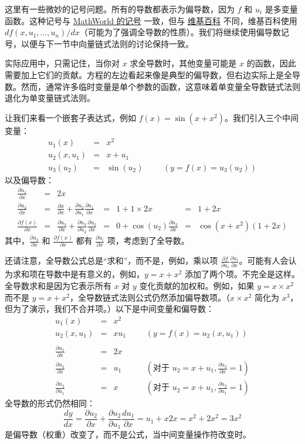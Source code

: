 \documentclass[11pt]{article}
\begin{document}
这里有一些微妙的记号问题。所有的导数都表示为偏导数，因为 $f$ 和 $u_i$ 是多变量函数。这种记号与 \href{http://mathworld.wolfram.com/TotalDerivative.html}{MathWorld 的记号} 一致，但与 \href{https://en.wikipedia.org/wiki/Total_derivative}{维基百科} 不同，维基百科使用 ${d f(x,u_1,\ldots,u_n)}/{d x}$（可能为了强调全导数的性质）。我们将继续使用偏导数记号，以便与下一节中向量链式法则的讨论保持一致。

实际应用中，只需记住，当你对 $x$ 求全导数时，其他变量可能是 $x$ 的函数，因此需要加上它们的贡献。方程的左边看起来像是典型的偏导数，但右边实际上是全导数。然而，通常许多临时变量是单个参数的函数，这意味着单变量全导数链式法则退化为单变量链式法则。

让我们来看一个嵌套子表达式，例如 $f(x) = \sin(x + x^2)$。我们引入三个中间变量：
\[
\begin{array}{lllllllll}
 u_1(x) &=& x^2\\
 u_2(x,u_1) &=& x + u_1\\
 u_3(u_2) &=& \sin(u_2) &&&(y = f(x) = u_3(u_2))
\end{array}
\]
以及偏导数：
\[
\begin{array}{lllllllll}
 \frac{\partial u_1}{\partial x} &=& 2x\\
 \frac{\partial u_2}{\partial x} &=& \frac{\partial x}{\partial x} + \frac{\partial u_2}{\partial u_1}\frac{\partial u_1}{\partial x} &=& 1 + 1 \times 2x &=& 1+2x\\
 \frac{\partial f(x)}{\partial x} &=& \frac{\partial u_3}{\partial x} + \frac{\partial u_3}{\partial u_2}\frac{\partial u_2}{\partial x} &=& 0 + \cos(u_2)\frac{\partial u_2}{\partial x} &=& \cos(x+x^2)(1+2x)
\end{array}
\]
其中，$\frac{\partial u_2}{\partial x}$ 和 $\frac{\partial f(x)}{\partial x}$ 都有 $\frac{\partial u_i}{\partial x}$ 项，考虑到了全导数。

还请注意，全导数公式总是“求和”，而不是，例如，乘以项 $\frac{\partial f}{\partial u_i}\frac{\partial  u_i}{\partial  x}$。可能有人会认为求和项在导数中是有意义的，例如，$y = x + x^2$ 添加了两个项。不完全是这样。全导数求和是因为它表示所有 $x$ 对 $y$ 变化贡献的加权和。例如，如果 $y = x \times x^2$ 而不是 $y = x + x^2$，全导数链式法则公式仍然添加偏导数项。（$x \times x^2$ 简化为 $x^3$，但为了演示，我们不合并项。）以下是中间变量和偏导数：
\[
\begin{array}{lllllllll}
 u_1(x) &=& x^2\\
 u_2(x,u_1) &=& x u_1 &&& (y = f(x) = u_2(x,u_1))\\
\\
 \frac{\partial u_1}{\partial x} &=& 2x\\
 \frac{\partial u_2}{\partial x} &=& u_1 &&&(\text{对于 } u_2 = x + u_1, \frac{\partial u_2}{\partial x} = 1)\\
 \frac{\partial u_2}{\partial u_1} &=& x &&&(\text{对于 } u_2 = x + u_1, \frac{\partial u_2}{\partial u_1} = 1)
\end{array}
\]
全导数的形式仍然相同：
\[\frac{dy}{dx} = \frac{\partial u_2}{\partial x} + \frac{\partial u_2}{\partial u_1}\frac{d u_1}{\partial  x} = u_1 + x 2x = x^2 + 2x^2 = 3x^2\]
是偏导数（权重）改变了，而不是公式，当中间变量操作符改变时。
\end{document}
